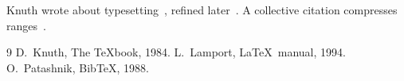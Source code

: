 \documentclass{article}
\begin{document}
Knuth wrote about typesetting~\cite{knuth84}, refined later~\cite{lamport94,knuth84}.
A collective citation compresses ranges~\cite{knuth84,lamport94,patashnik88}.
\begin{thebibliography}{9}
 D.~Knuth, The \TeX book, 1984.
 L.~Lamport, \LaTeX\ manual, 1994.
 O.~Patashnik, Bib\TeX, 1988.
\end{thebibliography}
\end{document}
